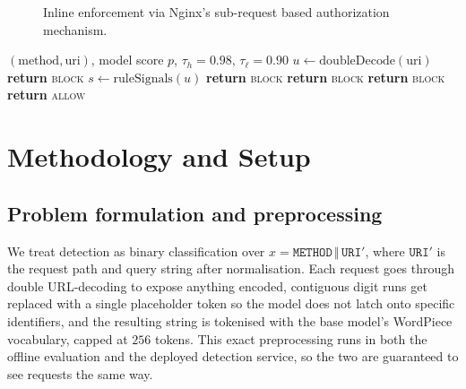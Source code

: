 \documentclass[conference]{IEEEtran}
\begin{document}
\begin{figure}[t]
\centering
{}
\caption{Inline enforcement via Nginx's sub-request based authorization mechanism.}
\label{fig:arch}
\end{figure}

\begin{algorithm}[t]
\caption{Decision fusion (Tier 4)}
\label{alg:fusion}
\begin{algorithmic}[1]
\REQUIRE $(\text{method},\text{uri})$, model score $p$, $\tau_h{=}0.98$, $\tau_\ell{=}0.90$
\STATE $u \gets \text{doubleDecode}(\text{uri})$
 \STATE \textbf{return} \textsc{block} \ENDIF
\STATE $s \gets \text{ruleSignals}(u)$
   \STATE \textbf{return} \textsc{block}
\ENDIF
{} \STATE \textbf{return} \textsc{block} \ENDIF
{}
   \STATE \textbf{return} \textsc{block}
\ENDIF
\STATE \textbf{return} \textsc{allow}
\end{algorithmic}
\end{algorithm}

\section{Methodology and Setup}

\subsection{Problem formulation and preprocessing}
We treat detection as binary classification over
$x=\texttt{METHOD}\,\Vert\,\texttt{URI}'$, where $\texttt{URI}'$ is the
request path and query string after normalisation. Each request goes
through double URL-decoding to expose anything encoded, contiguous digit
runs get replaced with a single placeholder token so the model does not
latch onto specific identifiers, and the resulting string is tokenised
with the base model's WordPiece vocabulary, capped at $256$ tokens. This
exact preprocessing runs in both the offline evaluation and the deployed
detection service, so the two are guaranteed to see requests the same
way.
\end{document}
